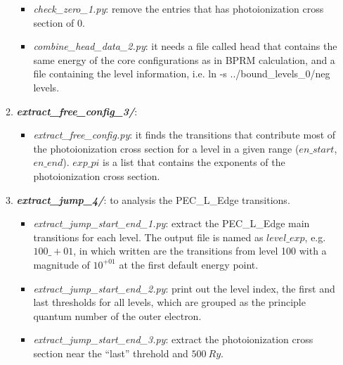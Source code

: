 \begin{enumerate}
\begin{enumerate}
\begin{itemize}
					\item \textit{check\_zero\_1.py}: remove the entries that has photoionization cross section of 0.
					\item \textit{combine\_head\_data\_2.py}: it needs a file called head that contains the same energy of the core configurations as in BPRM calculation, and a file containing the level information, i.e. \colorbox{gray!20} {ln -s ../bound\_levels\_0/neg levels}.
				\end{itemize}
			\item \textbf{\textit{extract\_free\_config\_3/}}:
				\begin{itemize}
					\item \textit{extract\_free\_config.py}:  it finds the transitions that contribute most of the photoionization cross section for a level in a given range ($en\_start$, $en\_end$). $exp\_pi$ is a list that contains the exponents of the photoionization cross section.
				\end{itemize}
			\item \textbf{\textit{extract\_jump\_4/}}: to analysis the PEC\_L\_Edge transitions.
				\begin{itemize}
					\item \textit{extract\_jump\_start\_end\_1.py}: extract the PEC\_L\_Edge main transitions for each level. The output file is named as $level\_exp$, e.g. $100\_+01$, in which written are the transitions from level 100 with a magnitude of $10^{+01}$ at the first default energy point.
					\item \textit{extract\_jump\_start\_end\_2.py}: print out the level index, the first and last thresholds for all levels, which are grouped as the principle quantum number of the outer electron.
					\item \textit{extract\_jump\_start\_end\_3.py}: extract the photoionization cross section near the ``last'' threhold and $500~Ry$.
				\end{itemize}
			
		\end{enumerate}
\end{enumerate}

